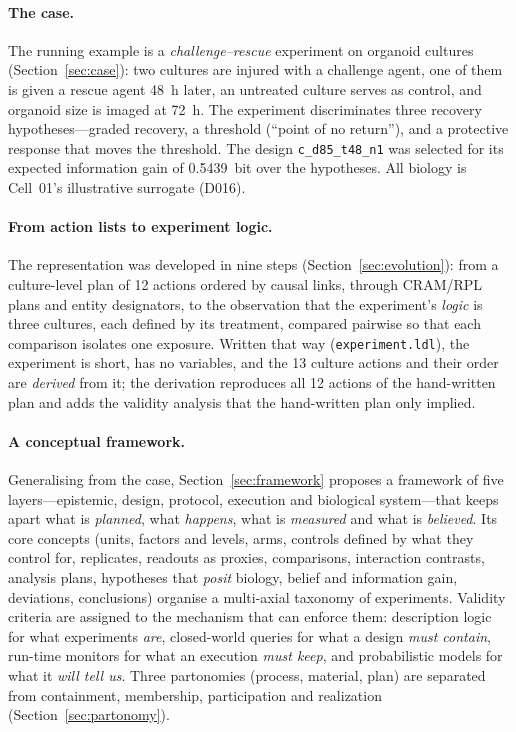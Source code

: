 \documentclass[10pt,a4paper]{article}
\begin{document}
\paragraph{The case.} The running example is a \emph{challenge--rescue} experiment on organoid cultures
(Section~\ref{sec:case}): two cultures are injured with a challenge agent, one of them is given a rescue agent
48~h later, an untreated culture serves as control, and organoid size is imaged at 72~h. The experiment
discriminates three recovery hypotheses---graded recovery, a threshold (``point of no return''), and a protective
response that moves the threshold. The design \texttt{c\_\allowbreak{}d85\_\allowbreak{}t48\_\allowbreak{}n1} was selected for its expected information gain of
0.5439~bit over the hypotheses. All biology is Cell~01's illustrative surrogate (D016).

\paragraph{From action lists to experiment logic.} The representation was developed in nine steps
(Section~\ref{sec:evolution}): from a culture-level plan of 12 actions ordered by causal links, through
CRAM/RPL plans and entity designators, to the observation that the experiment's \emph{logic} is three cultures,
each defined by its treatment, compared pairwise so that each comparison isolates one exposure. Written that way
(\texttt{experiment.ldl}), the experiment is short, has no variables, and the 13 culture actions and their
order are \emph{derived} from it; the derivation reproduces all 12 actions of the hand-written plan and adds
the validity analysis that the hand-written plan only implied.

\paragraph{A conceptual framework.} Generalising from the case, Section~\ref{sec:framework} proposes a framework of
five layers---epistemic, design, protocol, execution and biological system---that keeps apart what is
\emph{planned}, what \emph{happens}, what is \emph{measured} and what is \emph{believed}. Its core concepts (units,
factors and levels, arms, controls defined by what they control for, replicates, readouts as proxies, comparisons,
interaction contrasts, analysis plans, hypotheses that \emph{posit} biology, belief and information gain,
deviations, conclusions) organise a multi-axial taxonomy of experiments. Validity criteria are assigned to the
mechanism that can enforce them: description logic for what experiments \emph{are}, closed-world queries for what a
design \emph{must contain}, run-time monitors for what an execution \emph{must keep}, and probabilistic models for
what it \emph{will tell us}. Three partonomies (process, material, plan) are separated from containment, membership,
participation and realization (Section~\ref{sec:partonomy}).
\end{document}
